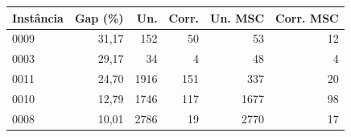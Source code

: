 \small
\begin{tabular}{lrrrrr}
\toprule
Instância & Gap (\%) & Un. & Corr. & Un. MSC & Corr. MSC \\
\midrule
0009 & 31,17 & 152 & 50 & 53 & 12 \\
0003 & 29,17 & 34 & 4 & 48 & 4 \\
0011 & 24,70 & 1916 & 151 & 337 & 20 \\
0010 & 12,79 & 1746 & 117 & 1677 & 98 \\
0008 & 10,01 & 2786 & 19 & 2770 & 17 \\
\bottomrule
\end{tabular}

